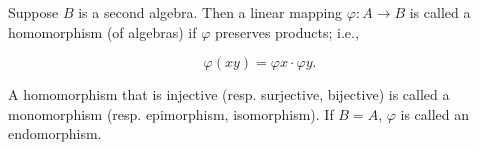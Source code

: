 Suppose $B$ is a second algebra. Then a linear mapping $\varphi: A \rightarrow B$ is called a homomorphism (of algebras) if $\varphi$ preserves products; i.e.,

$$\varphi(x y) = \varphi x \cdot \varphi y.$$

A homomorphism that is injective (resp. surjective, bijective) is called a monomorphism (resp. epimorphism, isomorphism). If $B = A$, $\varphi$ is called an endomorphism.
